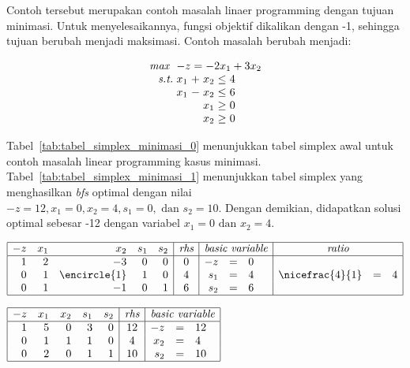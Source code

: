 Contoh tersebut merupakan contoh masalah linaer programming dengan tujuan minimasi. Untuk menyelesaikannya, fungsi objektif dikalikan dengan -1, sehingga tujuan berubah menjadi maksimasi. Contoh masalah berubah menjadi:

\begin{equation*}
	\setlength\arraycolsep{1.5pt}
	\begin{array}{r r c r c l}
		\textit{max } &\multicolumn{5}{l}{-z = -2x_1 + 3x_2}\\
		\textit{s.t.} &x_1 &+ &x_2 &\leq &4\\
		&x_1 &- &x_2 &\leq &6\\
		&&&x_1 &\geq &0\\
		&&&x_2 &\geq &0\\
	\end{array}
\end{equation*}

Tabel~\ref{tab:tabel_simplex_minimasi_0} menunjukkan tabel simplex awal untuk contoh masalah linear programming kasus minimasi. Tabel~\ref{tab:tabel_simplex_minimasi_1} menunjukkan tabel simplex yang menghasilkan \textit{bfs} optimal dengan nilai \(-z=12, x_1=0, x_2=4, s_1=0, \text{ dan } s_2=10\). Dengan demikian, didapatkan solusi optimal sebesar -12 dengan variabel \(x_1=0 \text{ dan } x_2=4\).

\begin{center}
	\label{tab:tabel_simplex_minimasi_0}
	$
	\begin{array}{|r r r r r |c|r c l|r c l|}
		\hline
		-z & x_1 & x_2 & s_1 & s_2 & \textit{rhs} & \multicolumn{3}{c|}{\textit{basic variable}} & \multicolumn{3}{c|}{\textit{ratio}}\\
		\hline
		1 & 2 & -3 & 0 & 0 & 0 & -z & = & 0 &&&\\
		0 & 1 & \encircle{1} & 1 & 0 & 4 & s_1 & = & 4 & \nicefrac{4}{1} & = & 4\\
		0 & 1 & -1 & 0 & 1 & 6 & s_2 & = & 6 &&&\\
		\hline
	\end{array}
	$
\end{center}

\begin{center}
	\label{tab:tabel_simplex_minimasi_1}
	$
	\begin{array}{|r r r r r |c|r c l|}
		\hline
		-z & x_1 & x_2 & s_1 & s_2 & \textit{rhs} & \multicolumn{3}{c|}{\textit{basic variable}}\\
		\hline
		1 & 5 & 0 & 3 & 0 & 12 & -z & = & 12\\
		0 & 1 & 1 & 1 & 0 & 4 & x_2 & = & 4\\
		0 & 2 & 0 & 1 & 1 & 10 & s_2 & = & 10\\
		\hline
	\end{array}
	$
\end{center}

